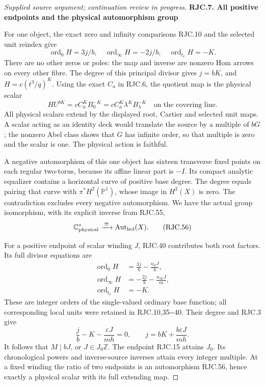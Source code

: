 \begin{proof}[Supplied source argument; continuation review in progress]
\par

\medskip\noindent\textbf{RJC.7. All positive endpoints and the physical automorphism group}

\par\nobreak

For one object, the exact zero and infinity comparisons
RJC.10 and the selected unit reindex give
\[
 \operatorname{ord}_0H=3j/b,\quad
 \operatorname{ord}_\infty H=-2j/b,\quad
 \operatorname{ord}_{t_c}H=-K.
 \tag{RJC.54}
\]
There are no other zeros or poles: the map and inverse
are nonzero Hom arrows on every other fibre.
The degree of this principal divisor gives \(j=bK\),
and \(H=c(t^3/q)^K\).
Using the exact \(C_a\) in RJC.6, the quotient map is
the physical scalar
\[
 H U^{bK}=cC_a^K B_0^{-K}
        =cC_a^K\lambda^K B_\lambda^{-K}
        \quad\text{on the covering line.}
 \tag{RJC.55}
\]
All physical scalars extend by the displayed root,
Cartier and selected unit maps. A scalar acting as an
identity deck would translate the source by a multiple
of \(bG\); the nonzero Abel class shows that \(G\) has
infinite order, so that multiple is zero and the scalar
is one. The physical action is faithful.

A negative automorphism of this one object has
sixteen transverse fixed points on each regular
two-torus, because its affine linear part is \(-I\).
Its compact analytic equalizer contains a horizontal
curve of positive base degree. The degree equals
pairing that curve with \(\pi^*H^2(\mathbb P^1)\),
whose image in \(H^2(X)\) is zero. The contradiction
excludes every negative automorphism. We have the
actual group isomorphism, with its explicit inverse
from RJC.55,
\[
 \mathbb C^*_{\rm physical}
 \xrightarrow{\;\cong\;}\operatorname{Aut}_{\rm hol}(X).
 \tag{RJC.56}
\]

For a positive endpoint of scalar winding \(J\), RJC.40
contributes both root factors. Its full divisor equations
are
\[
 \begin{split}
 \operatorname{ord}_0H&=\frac{3j}{b}-\frac{n_0J}{h},\\
 \operatorname{ord}_\infty H&=-\frac{2j}{b}
                                  -\frac{n_\infty J}{m},\\
 \operatorname{ord}_{t_c}H&=-K.
 \end{split}
 \tag{RJC.57}
\]
These are integer orders of the single-valued ordinary
base function; all corresponding local units were retained
in RJC.10,35-\/-40. Their degree and RJC.3 give
\[
 \frac jb-K-\frac{\varepsilon J}{mh}=0,\qquad
 j=bK+\frac{b\varepsilon J}{mh}.
 \tag{RJC.58}
\]
It follows that \(M\mid bJ\), or \(J\in J_0\mathbb Z\).
The endpoint RJC.15 attains \(J_0\). Its chronological
powers and inverse-source inverses attain every integer
multiple. At a fixed winding the ratio of two endpoints
is an automorphism RJC.56, hence exactly a physical
scalar with its full extending map.


\end{proof}
